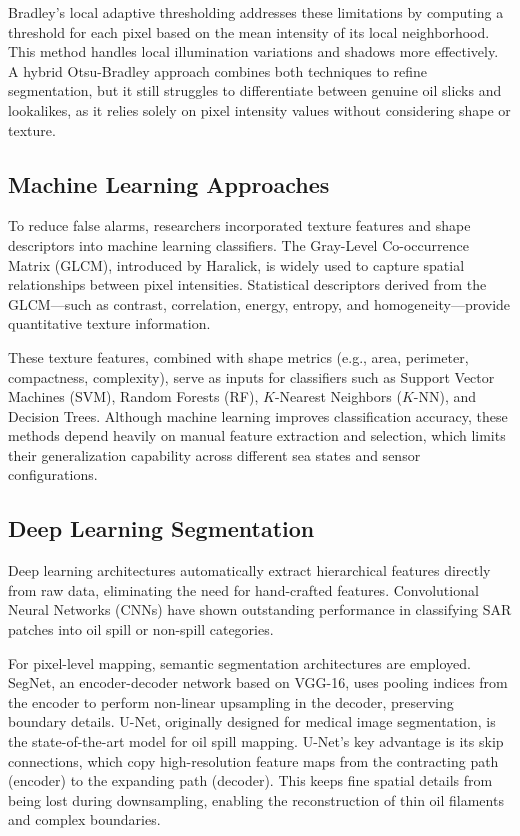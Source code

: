 \documentclass[conference]{IEEEtran}
\begin{document}
Bradley's local adaptive thresholding addresses these limitations by computing a threshold for each pixel based on the mean intensity of its local neighborhood. This method handles local illumination variations and shadows more effectively. A hybrid Otsu-Bradley approach combines both techniques to refine segmentation, but it still struggles to differentiate between genuine oil slicks and lookalikes, as it relies solely on pixel intensity values without considering shape or texture.

\subsection{Machine Learning Approaches}
To reduce false alarms, researchers incorporated texture features and shape descriptors into machine learning classifiers. The Gray-Level Co-occurrence Matrix (GLCM), introduced by Haralick, is widely used to capture spatial relationships between pixel intensities. Statistical descriptors derived from the GLCM—such as contrast, correlation, energy, entropy, and homogeneity—provide quantitative texture information.

These texture features, combined with shape metrics (e.g., area, perimeter, compactness, complexity), serve as inputs for classifiers such as Support Vector Machines (SVM), Random Forests (RF), $K$-Nearest Neighbors ($K$-NN), and Decision Trees. Although machine learning improves classification accuracy, these methods depend heavily on manual feature extraction and selection, which limits their generalization capability across different sea states and sensor configurations.

\subsection{Deep Learning Segmentation}
Deep learning architectures automatically extract hierarchical features directly from raw data, eliminating the need for hand-crafted features. Convolutional Neural Networks (CNNs) have shown outstanding performance in classifying SAR patches into oil spill or non-spill categories.

For pixel-level mapping, semantic segmentation architectures are employed. SegNet, an encoder-decoder network based on VGG-16, uses pooling indices from the encoder to perform non-linear upsampling in the decoder, preserving boundary details. U-Net, originally designed for medical image segmentation, is the state-of-the-art model for oil spill mapping. U-Net's key advantage is its skip connections, which copy high-resolution feature maps from the contracting path (encoder) to the expanding path (decoder). This keeps fine spatial details from being lost during downsampling, enabling the reconstruction of thin oil filaments and complex boundaries.
\end{document}
